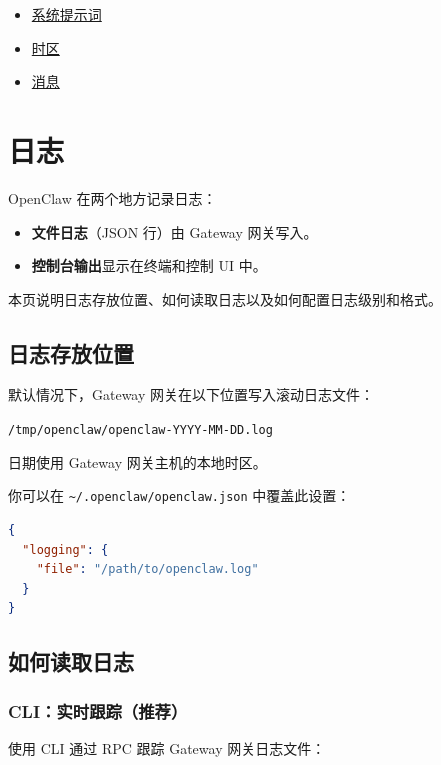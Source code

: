 \begin{itemize}
  \item \href{/concepts/system-prompt}{系统提示词}
  \item \href{/concepts/timezone}{时区}
  \item \href{/concepts/messages}{消息}
\end{itemize}



\clearpage

\section{日志}


OpenClaw 在两个地方记录日志：

\begin{itemize}
  \item \textbf{文件日志}（JSON 行）由 Gateway 网关写入。
  \item \textbf{控制台输出}显示在终端和控制 UI 中。
\end{itemize}


本页说明日志存放位置、如何读取日志以及如何配置日志级别和格式。

\subsection{日志存放位置}


默认情况下，Gateway 网关在以下位置写入滚动日志文件：

\texttt{/tmp/openclaw/openclaw-YYYY-MM-DD.log}

日期使用 Gateway 网关主机的本地时区。

你可以在 \texttt{\textasciitilde{}/.openclaw/openclaw.json} 中覆盖此设置：

\begin{lstlisting}[language=json]
{
  "logging": {
    "file": "/path/to/openclaw.log"
  }
}
\end{lstlisting}


\subsection{如何读取日志}


\subsubsection{CLI：实时跟踪（推荐）}


使用 CLI 通过 RPC 跟踪 Gateway 网关日志文件：

